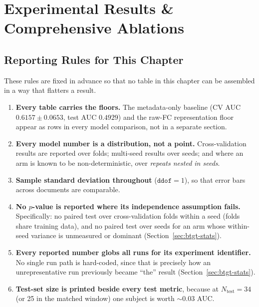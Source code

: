 \chapter{Experimental Results \& Comprehensive Ablations}
\label{ch:results}


\section{Reporting Rules for This Chapter}
\label{sec:reporting-rules}

These rules are fixed in advance so that no table in this chapter can be assembled in a way
that flatters a result.

\begin{enumerate}
  \item \textbf{Every table carries the floors.} The metadata-only baseline
    (CV AUC $0.6157 \pm 0.0653$, test AUC $0.4929$) and the raw-FC representation floor
    appear as rows in every model comparison, not in a separate section.
  \item \textbf{Every model number is a distribution, not a point.} Cross-validation results
    are reported over folds; multi-seed results over seeds; and where an arm is known to be
    non-deterministic, over \emph{repeats nested in seeds}.
  \item \textbf{Sample standard deviation throughout} ($\mathtt{ddof}=1$), so that error
    bars across documents are comparable.
  \item \textbf{No $p$-value is reported where its independence assumption fails.}
    Specifically: no paired test over cross-validation folds within a seed (folds share
    training data), and no paired test over seeds for an arm whose within-seed variance is
    unmeasured or dominant (Section~\ref{sec:btgt-stats}).
  \item \textbf{Every reported number globs all runs for its experiment identifier.} No
    single run path is hard-coded, since that is precisely how an unrepresentative run
    previously became ``the'' result (Section~\ref{sec:btgt-stats}).
  \item \textbf{Test-set size is printed beside every test metric}, because at
    $N_{\text{test}} = 34$ (or 25 in the matched window) one subject is worth
    $\sim 0.03$ AUC.
\end{enumerate}


